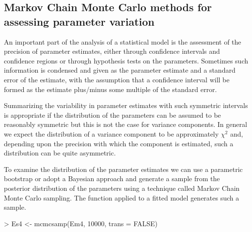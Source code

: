 \documentclass[12pt]{article}
\begin{document}
\subsection{Markov Chain Monte Carlo methods for assessing parameter variation}
\label{sec:MCMC}

An important part of the analysis of a statistical model is the
assessment of the precision of parameter estimates, either through
confidence intervals and confidence regions or through hypothesis
tests on the parameters.  Sometimes such information is condensed and
given as the parameter estimate and a standard error of the estimate,
with the assumption that a confidence interval will be formed as the
estimate plus/minus some multiple of the standard error.

Summarizing the variability in parameter estimates with such symmetric
intervals is appropriate if the distribution of the parameters can
be assumed to be reasonably symmetric but this is not the case for
variance components.  In general we expect the distribution of a
variance component to be approximately $\chi^2$ and, depending upon the
precision with which the component is estimated, such a distribution
can be quite asymmetric.

To examine the distribution of the parameter estimates we can use a
parametric bootstrap or adopt a Bayesian approach and generate a
sample from the posterior distribution of the parameters using a
technique called Markov Chain Monte Carlo sampling. The
 function applied to a fitted  model
generates such a sample.

\begin{Schunk}
\begin{Sinput}
> Es4 <- mcmcsamp(Em4, 10000, trans = FALSE)
\end{Sinput}
\end{Schunk}
\end{document}
